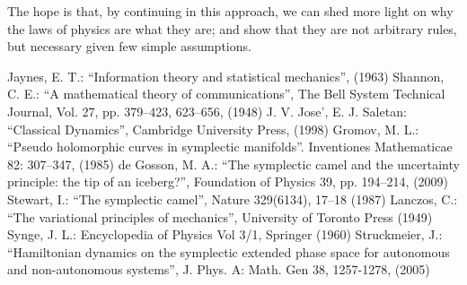 \documentclass[aps,twocolumn,floatfix,nofootinbib]{revtex4}   %
\theoremstyle{definition}
\begin{document}
The hope is that, by continuing in this approach, we can shed more light on why the laws of physics are what they are; and show that they are not arbitrary rules, but necessary given few simple assumptions.

\begin{thebibliography}{5}

 Jaynes, E. T.: ``Information theory and statistical mechanics'', (1963)
 Shannon, C. E.: ``A mathematical theory of communications'', The Bell System Technical Journal, Vol. 27, pp. 379–423, 623–656, (1948)
 J. V. Jose', E. J. Saletan: ``Classical Dynamics'', Cambridge University Press, (1998)
 Gromov, M. L.: ``Pseudo holomorphic curves in symplectic manifolds''. Inventiones Mathematicae 82: 307–347, (1985)
 de Gosson, M. A.: ``The symplectic camel and the uncertainty principle: the tip of an iceberg?'', Foundation of Physics 39, pp. 194–214, (2009)
 Stewart, I.: ``The symplectic camel'', Nature 329(6134), 17–18 (1987)
 Lanczos, C.: ``The variational principles of mechanics'', University of Toronto Press (1949)
 Synge, J. L.: Encyclopedia of Physics Vol 3/1, Springer (1960)
 Struckmeier, J.: ``Hamiltonian dynamics on the symplectic extended phase space for autonomous and non-autonomous systems'', J. Phys. A: Math. Gen 38, 1257-1278, (2005)

\end{thebibliography}
\end{document}
